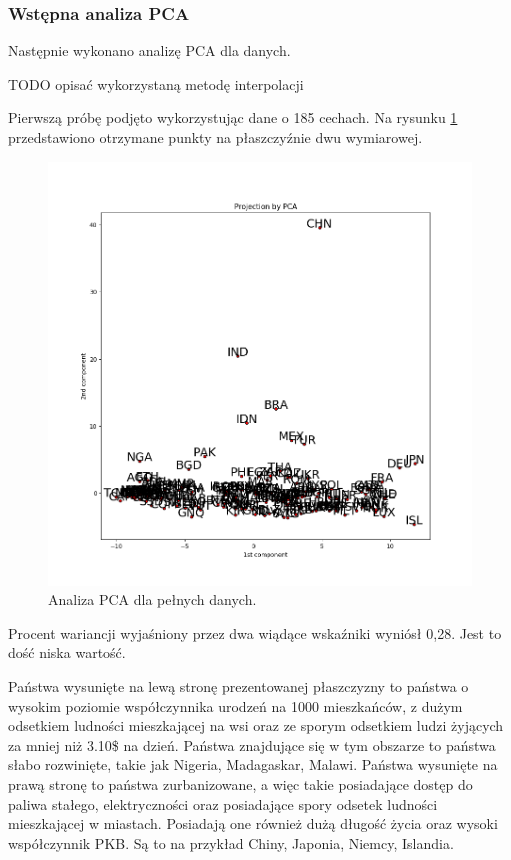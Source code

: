 \documentclass{article}
\begin{document}
\clearpage
\subsubsection{Wstępna analiza PCA}

Następnie wykonano analizę PCA dla danych.

TODO opisać wykorzystaną metodę interpolacji

Pierwszą próbę podjęto wykorzystując dane o 185 cechach.
Na rysunku \ref{fig:4_PCA_full} przedstawiono otrzymane punkty na płaszczyźnie dwu wymiarowej.

\begin{figure}[h!]
\begin{center}
\includegraphics[width=5 in]{Pictures/4_PCA_full.png}
\end{center}
\captionsetup{justification=centering}
\caption{Analiza PCA dla pełnych danych.}
\label{fig:4_PCA_full}
\end{figure}

Procent wariancji wyjaśniony przez dwa wiądące wskaźniki wyniósł 0,28.
Jest to dość niska wartość.

Państwa wysunięte na lewą stronę prezentowanej płaszczyzny to państwa o wysokim poziomie współczynnika
urodzeń na 1000 mieszkańców, z dużym odsetkiem ludności mieszkającej na wsi oraz ze sporym odsetkiem ludzi żyjących za mniej niż 3.10\$ na dzień. Państwa znajdujące się w tym obszarze to państwa słabo rozwinięte, takie jak Nigeria, Madagaskar, Malawi.
Państwa wysunięte na prawą stronę to państwa zurbanizowane, a więc takie posiadające dostęp do paliwa
stałego, elektryczności oraz posiadające spory odsetek ludności mieszkającej w miastach. Posiadają one również dużą długość życia oraz wysoki współczynnik PKB. Są to na przykład Chiny, Japonia, Niemcy, Islandia.
\end{document}
